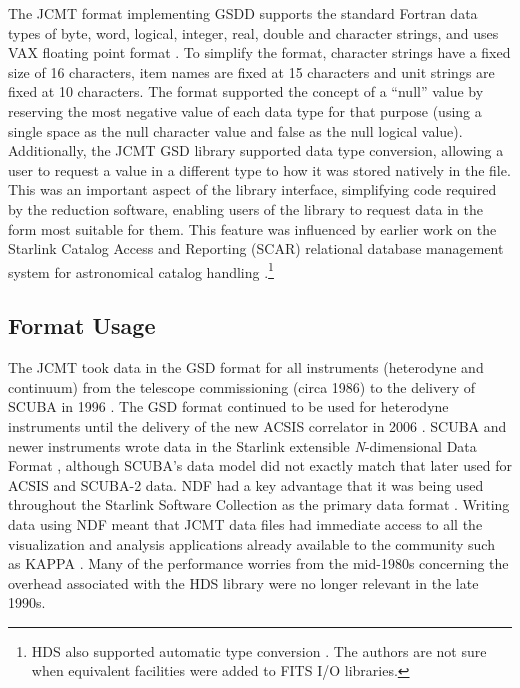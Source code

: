 \documentclass[final,authoryear,5p,times,twocolumn]{elsarticle}
\newcommand{\ascl}[1]{\href{http://www.ascl.net/#1}{ascl:#1}}
\begin{document}
The JCMT format implementing GSDD supports the standard Fortran data
types of byte, word, logical, integer, real, double and character
strings, and uses VAX floating point format \citep[see][for more
information on VAX floating point
format]{Payne:1980:VFP:641845.641849}. To simplify the format,
character strings have a fixed size of 16 characters, item names are
fixed at 15 characters and unit strings are fixed at 10
characters. The format supported the concept of a ``null'' value by
reserving the most negative value of each data type for that purpose
(using a single space as the null character value and false as the
null logical value). Additionally, the JCMT GSD library supported data
type conversion, allowing a user to request a value in a different
type to how it was stored natively in the file. This was an important
aspect of the library interface, simplifying code required by the
reduction software, enabling users of the library to request data in
the form most suitable for them. This feature was influenced by
earlier work on the Starlink Catalog Access and Reporting (SCAR)
relational database management system for astronomical catalog
handling \citep{SUN70}.\footnote{HDS also supported automatic type
  conversion \citep{SSN27}. The authors are not sure when equivalent
  facilities were added to FITS I/O libraries.}

\subsection{Format Usage}

The JCMT took data in the GSD format for all instruments (heterodyne
and continuum) from the telescope commissioning (circa 1986) to the
delivery of SCUBA in 1996 \citep{1999MNRAS.303..659H}. The GSD format
continued to be used for heterodyne instruments until the delivery of
the new ACSIS correlator in 2006 \citep{2009MNRAS.399.1026B}.  SCUBA
and newer instruments wrote data in the Starlink extensible
\emph{N}-dimensional Data Format \citep[NDF;][]{2015NDF}, although
SCUBA's data model did not exactly match that later used for ACSIS and
SCUBA-2 \citep{2013MNRAS.430.2513H} data. NDF had a key advantage that
it was being used throughout the Starlink Software Collection as the
primary data format \citep{1992ASPC...25..126A}. Writing data using
NDF meant that JCMT data files had immediate access to all the
visualization and analysis applications already available to the
community such as KAPPA \citep[][\ascl{1403.022}]{SUN95}. Many of the
performance worries from the mid-1980s concerning the overhead
associated with the HDS library were no longer relevant in the late 1990s.
\end{document}
